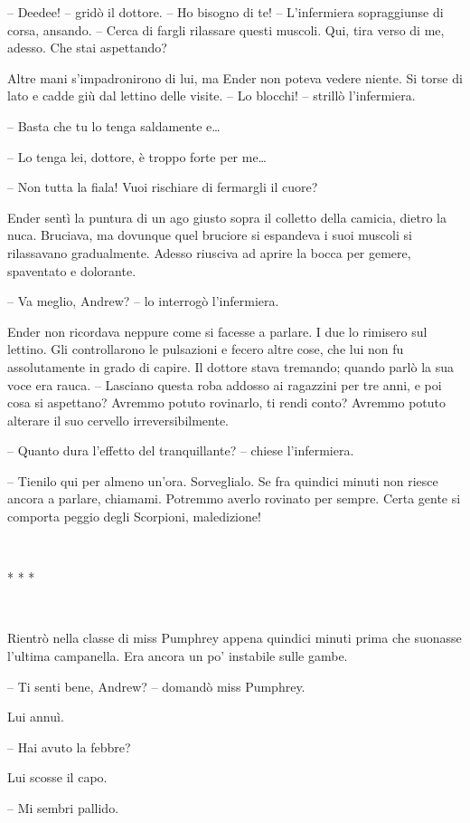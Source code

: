 {-- Deedee! -- gridò il dottore. -- Ho bisogno di te! -- L'infermiera
	sopraggiunse di corsa, ansando. -- Cerca di fargli rilassare questi
	muscoli. Qui, tira verso di me, adesso. Che stai aspettando?}

{Altre mani s'impadronirono di lui, ma Ender non poteva vedere niente.
	Si torse di lato e cadde giù dal lettino delle visite. -- Lo blocchi! --
	strillò l'infermiera.}

{-- Basta che tu lo tenga saldamente e\ldots{}}

{-- Lo tenga lei, dottore, è troppo forte per me\ldots{}}

{-- Non tutta la fiala! Vuoi rischiare di fermargli il cuore?}

{Ender sentì la puntura di un ago giusto sopra il colletto della
	camicia, dietro la nuca. Bruciava, ma dovunque quel bruciore si
	espandeva i suoi muscoli si rilassavano gradualmente. Adesso riusciva ad
	aprire la bocca per gemere, spaventato e dolorante.}

{-- Va meglio, Andrew? -- lo interrogò l'infermiera.}

{Ender non ricordava neppure come si facesse a parlare. I due lo
	rimisero sul lettino. Gli controllarono le pulsazioni e fecero altre
	cose, che lui non fu assolutamente in grado di capire. Il dottore stava
	tremando; quando parlò la sua voce era rauca. -- Lasciano questa roba
	addosso ai ragazzini per tre anni, e poi cosa si aspettano? Avremmo
	potuto rovinarlo, ti rendi conto? Avremmo potuto alterare il suo
	cervello irreversibilmente.}

{-- Quanto dura l'effetto del tranquillante? -- chiese l'infermiera.}

{-- Tienilo qui per almeno un'ora. Sorveglialo. Se fra quindici minuti
	non riesce ancora a parlare, chiamami. Potremmo averlo rovinato per
	sempre. Certa gente si comporta peggio degli Scorpioni, maledizione!}

{~}

{* * *}

{~}

{Rientrò nella classe di miss Pumphrey appena quindici minuti prima che
	suonasse l'ultima campanella. Era ancora un po' instabile sulle gambe.}

{-- Ti senti bene, Andrew? -- domandò miss Pumphrey.}

{Lui annuì.}

{-- Hai avuto la febbre?}

{Lui scosse il capo.}

{-- Mi sembri pallido.}


